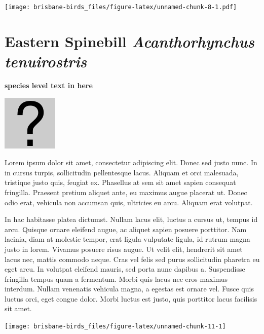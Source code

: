 \documentclass[]{book}
\let\origfigure\figure
\let\endorigfigure\endfigure
\renewenvironment{figure}[1][2] {
  \expandafter\origfigure\expandafter[H]
} {
  \endorigfigure
}
\begin{document}
\begin{figure}
\centering
\texttt{[image: brisbane-birds\_files/figure-latex/unnamed-chunk-8-1.pdf]}
\caption{\label{fig:unnamed-chunk-8}insert figure caption}
\end{figure}

\section{\texorpdfstring{Eastern Spinebill \emph{Acanthorhynchus
tenuirostris}}{Eastern Spinebill Acanthorhynchus tenuirostris}}\label{eastern-spinebill-acanthorhynchus-tenuirostris}

\textbf{species level text in here}

\begin{figure}
\centering
\includegraphics{assets/missing.png}
\caption{No image for species}
\end{figure}

Lorem ipsum dolor sit amet, consectetur adipiscing elit. Donec sed justo
nunc. In in cursus turpis, sollicitudin pellentesque lacus. Aliquam et
orci malesuada, tristique justo quis, feugiat ex. Phasellus at sem sit
amet sapien consequat fringilla. Praesent pretium aliquet ante, eu
maximus augue placerat ut. Donec odio erat, vehicula non accumsan quis,
ultricies eu arcu. Aliquam erat volutpat.

In hac habitasse platea dictumst. Nullam lacus elit, luctus a cursus ut,
tempus id arcu. Quisque ornare eleifend augue, ac aliquet sapien posuere
porttitor. Nam lacinia, diam at molestie tempor, erat ligula vulputate
ligula, id rutrum magna justo in lorem. Vivamus posuere risus augue. Ut
velit elit, hendrerit sit amet lacus nec, mattis commodo neque. Cras vel
felis sed purus sollicitudin pharetra eu eget arcu. In volutpat eleifend
mauris, sed porta nunc dapibus a. Suspendisse fringilla tempus quam a
fermentum. Morbi quis lacus nec eros maximus interdum. Nullam venenatis
vehicula magna, a egestas est ornare vel. Fusce quis luctus orci, eget
congue dolor. Morbi luctus est justo, quis porttitor lacus facilisis sit
amet.

\begin{figure}
\texttt{[image: brisbane-birds\_files/figure-latex/unnamed-chunk-11-1]} \caption{insert figure caption}\label{fig:unnamed-chunk-11}
\end{figure}
\end{document}
